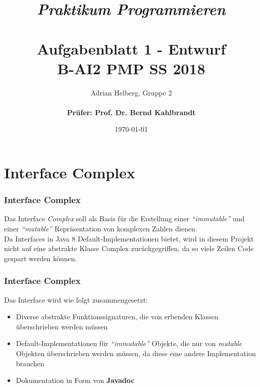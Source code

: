 \documentclass{beamer}
\title{
	\textit{Praktikum Programmieren} \\
	\textbf{\\Aufgabenblatt 1 - Entwurf} \\
	\scriptsize{B-AI2 PMP SS 2018}
}
\author{Adrian Helberg, Gruppe 2 \\\textbf{\\ Prüfer: Prof. Dr. Bernd Kahlbrandt}}
\date{\today}
\begin{document}

\maketitle

\frame{\tableofcontents}

\section{Interface Complex}
\begin{frame}
\frametitle{Interface Complex}

Das Interface \textit{Complex} soll als Basis f\"ur die Erstellung einer \textit{``immutable''} und einer \textit{``mutable''} Repr\"asentation
von komplexen Zahlen dienen.\\
Da Interfaces in Java 8 Default-Implementationen bietet, wird in diesem Projekt nicht auf eine abstrakte Klasse Complex zur\"uckgegriffen,
da so viele Zeilen Code gespart werden k\"onnen.

\end{frame}

\begin{frame}
\frametitle{Interface Complex}

Das Interface wird wie folgt zusammengesetzt:

\begin{itemize}
\setlength{\itemsep}{12pt}
\item Diverse abstrakte Funktionssignaturen, die von erbenden Klassen \"uberschrieben werden m\"ussen
\item Default-Implementationen f\"ur \textit{``immutable''} Objekte, die nur von \textit{mutable} Objekten \"uberschrieben werden m\"ussen,
da diese eine andere Implementation brauchen
\item Dokumentation in Form von \textbf{Javadoc}
\end{itemize}

\end{frame}
\end{document}
